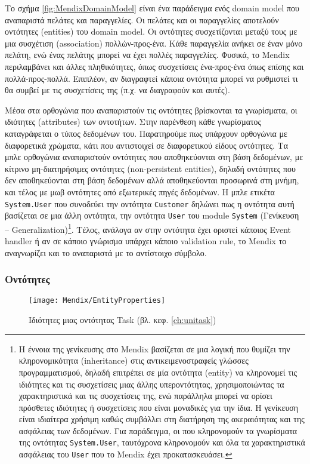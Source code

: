             Το σχήμα \ref{fig:MendixDomainModel} είναι ένα παράδειγμα ενός domain model που αναπαριστά πελάτες και παραγγελίες. Οι πελάτες και οι παραγγελίες αποτελούν οντότητες (entities) του domain model. Οι οντότητες συσχετίζονται μεταξύ τους με μια συσχέτιση (association) πολλών-προς-ένα. Κάθε παραγγελία ανήκει σε έναν μόνο πελάτη, ενώ ένας πελάτης μπορεί να έχει πολλές παραγγελίες. Φυσικά, το Mendix περιλαμβάνει και άλλες πληθικότητες, όπως συσχετίσεις ένα-προς-ένα όπως επίσης και πολλά-προς-πολλά. Επιπλέον, αν διαγραφτεί κάποια οντότητα μπορεί να ρυθμιστεί τι θα συμβεί με τις συσχετίσεις της (π.χ. να διαγραφούν και αυτές).

            Μέσα στα ορθογώνια που αναπαριστούν τις οντότητες βρίσκονται τα γνωρίσματα, οι ιδιότητες (attributes) των οντοτήτων. Στην παρένθεση κάθε γνωρίσματος καταγράφεται ο τύπος δεδομένων του. Παρατηρούμε πως υπάρχουν ορθογώνια με διαφορετικά χρώματα, κάτι που αντιστοιχεί σε διαφορετικού είδους οντότητες. Τα μπλε ορθογώνια αναπαριστούν οντότητες που αποθηκεύονται στη βάση δεδομένων, με κίτρινο μη-διατηρήσιμες οντότητες (non-persistent entities), δηλαδή οντότητες που δεν αποθηκεύονται στη βάση δεδομένων αλλά αποθηκεύονται προσωρινά στη μνήμη, και τέλος με μωβ οντότητες από εξωτερικές πηγές δεδομένων. Η μπλε ετικέτα \texttt{System.User} που συνοδεύει την οντότητα \texttt{Customer} δηλώνει πως η οντότητα αυτή βασίζεται σε μια άλλη οντότητα, την οντότητα \texttt{User} του module \texttt{System} (Γενίκευση -- Generalization)\footnote{Η έννοια της γενίκευσης στο Mendix βασίζεται σε μια λογική που θυμίζει την κληρονομικότητα (inheritance) στις αντικειμενοστραφείς γλώσσες προγραμματισμού, δηλαδή επιτρέπει σε μία οντότητα (entity) να κληρονομεί τις ιδιότητες και τις συσχετίσεις μιας άλλης υπεροντότητας, χρησιμοποιώντας τα χαρακτηριστικά και τις συσχετίσεις της, ενώ παράλληλα μπορεί να ορίσει πρόσθετες ιδιότητες ή συσχετίσεις που είναι μοναδικές για την ίδια. Η γενίκευση είναι ιδιαίτερα χρήσιμη καθώς συμβάλλει στη διατήρηση της ακεραιότητας και της ασφάλειας των δεδομένων. Για παράδειγμα, οι  που κληρονομούν τα γνωρίσματα της οντότητας \texttt{System.User}, ταυτόχρονα κληρονομούν και όλα τα χαρακτηριστικά ασφάλειας του \texttt{User} που το Mendix έχει προκατασκευάσει.}. Τέλος, ανάλογα αν στην οντότητα έχει οριστεί κάποιος Event handler ή αν σε κάποιο γνώρισμα υπάρχει κάποιο validation rule, το Mendix το αναγνωρίζει και το αναπαριστά με το αντίστοιχο σύμβολο.

            \subsubsection{Οντότητες}
                \begin{figure}[h!] \noindent \centering
                        \texttt{[image: Mendix/EntityProperties]}
                        \caption{\centering Ιδιότητες μιας οντότητας Task (βλ. κεφ. \ref{ch:unitask})}
                        \label{fig:MendixEntityProperties}
                \end{figure}


